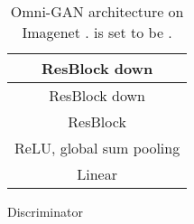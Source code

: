 \documentclass[paper_2425.tex]{subfiles}
\begin{document}
\begin{table*}[htbp]
\begin{subtable}[t]{0.48\linewidth}
{\begin{tabular}{c}
        ResBlock down                       \\ \midrule
        ResBlock down                      \\ \midrule
        ResBlock                          \\ \midrule
        ReLU, global sum pooling                                 \\ \midrule
        Linear                                 \\
        \bottomrule
      \end{tabular}}
    \caption{Discriminator}
  \end{subtable}
  \caption{Omni-GAN architecture on Imagenet .  is set to be .}
  \label{apx:tab:omnigan_imagenet256}
\end{table*}


\begin{table*}[htbp]
  \begin{subtable}[t]{0.48\linewidth}
    \centering
\end{subtable}
\end{table*}
\end{document}
